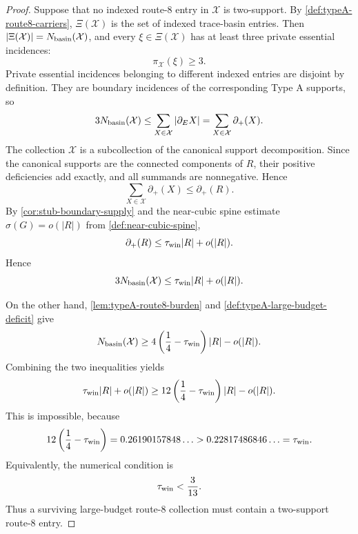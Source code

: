 \documentclass[11pt]{article}
\newcommand{\defp}{\partial_+}
\begin{document}
\begin{proof}
	Suppose that no indexed route-8 entry in $\mathcal X$ is two-support.  By
	\cref{def:typeA-route8-carriers}, \(\Xi(\mathcal X)\) is the set of indexed
	trace-basin entries.  Then
$|\Xi(\mathcal X)|=N_{\rm basin}(\mathcal X)$, and every
$\xi\in\Xi(\mathcal X)$ has at least three private essential incidences:
\[
\pi_{\mathcal X}(\xi)\ge3.
\]
Private essential incidences belonging to different indexed entries are disjoint
by definition.  They are boundary incidences of the corresponding Type A
supports, so
\[
3N_{\rm basin}(\mathcal X)
\le
\sum_{X\in\mathcal X}|\partial_E X|
=
\sum_{X\in\mathcal X}\defp(X).
\]
The collection $\mathcal X$ is a subcollection of the canonical support
decomposition.  Since the canonical supports are the connected components of
\(R\), their positive deficiencies add exactly, and all summands are
nonnegative.  Hence
\[
\sum_{X\in\mathcal X}\defp(X)
\le
\defp(R).
\]
By \cref{cor:stub-boundary-supply} and the near-cubic spine estimate
\(\sigma(G)=o(|R|)\) from \cref{def:near-cubic-spine},
\[
\defp(R)\le\tau_{\rm win}|R|+o(|R|).
\]
Hence
\[
3N_{\rm basin}(\mathcal X)
\le
\tau_{\rm win}|R|+o(|R|).
\]

On the other hand, \cref{lem:typeA-route8-burden} and
\cref{def:typeA-large-budget-deficit} give
\[
N_{\rm basin}(\mathcal X)
\ge
4\left(\frac14-\tau_{\rm win}\right)|R|-o(|R|).
\]
Combining the two inequalities yields
\[
\tau_{\rm win}|R|+o(|R|)
\ge
12\left(\frac14-\tau_{\rm win}\right)|R|-o(|R|).
\]
This is impossible, because
\[
12\left(\frac14-\tau_{\rm win}\right)
=0.26190157848\ldots
>
0.22817486846\ldots
=\tau_{\rm win}.
\]
Equivalently, the numerical condition is
\[
\tau_{\rm win}<\frac3{13}.
\]
Thus a surviving large-budget route-8 collection must contain a two-support
route-8 entry.
\end{proof}
\end{document}
